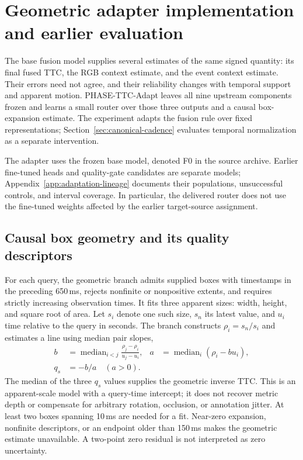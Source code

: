\section{Geometric adapter implementation and earlier evaluation}
\label{app:quality-complete}

The base fusion model supplies several estimates of the same signed quantity: its final fused TTC, the RGB context estimate, and the event context estimate. Their errors need not agree, and their reliability changes with temporal support and apparent motion. PHASE-TTC-Adapt leaves all nine upstream components frozen and learns a small router over those three outputs and a causal box-expansion estimate. The experiment adapts the fusion rule over fixed representations; Section~\ref{sec:canonical-cadence} evaluates temporal normalization as a separate intervention. 

The adapter uses the frozen base model, denoted F0 in the source archive. Earlier fine-tuned heads and quality-gate candidates are separate models; Appendix~\ref{app:adaptation-lineage} documents their populations, unsuccessful controls, and interval coverage. In particular, the delivered router does not use the fine-tuned weights affected by the earlier target-source assignment.

\subsection{Causal box geometry and its quality descriptors}
For each query, the geometric branch admits supplied boxes with timestamps in the preceding 650\,ms, rejects nonfinite or nonpositive extents, and requires strictly increasing observation times. It fits three apparent sizes: width, height, and square root of area. Let $s_i$ denote one such size, $s_n$ its latest value, and $u_i$ time relative to the query in seconds. The branch constructs $\rho_i=s_n/s_i$ and estimates a line using median pair slopes,
\begin{align}
 b &= \operatorname{median}_{i<j}\frac{\rho_j-\rho_i}{u_j-u_i},
 &a &= \operatorname{median}_i(\rho_i-bu_i),\\
 q_s&=-b/a \quad (a>0).
\end{align}
The median of the three $q_s$ values supplies the geometric inverse TTC. This is an apparent-scale model with a query-time intercept; it does not recover metric depth or compensate for arbitrary rotation, occlusion, or annotation jitter. At least two boxes spanning 10\,ms are needed for a fit. Near-zero expansion, nonfinite descriptors, or an endpoint older than 150\,ms makes the geometric estimate unavailable. A two-point zero residual is not interpreted as zero uncertainty. 

